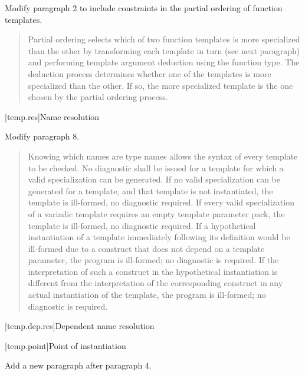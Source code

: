 Modify paragraph 2 to include constraints in the partial ordering
of function templates.

\begin{quote}
\setcounter{Paras}{1}
\pnum
Partial ordering selects which of two function templates is 
more specialized than the other by transforming each template 
in turn (see next paragraph) and performing template argument 
deduction using the function type. The deduction process 
determines whether one of the templates is more specialized 
than the other.
% 
If so, the more specialized template is the one chosen by the 
partial ordering process. 
% 
\end{quote}

[temp.res]{Name resolution}

Modify paragraph 8.

\begin{quote}
\setcounter{Paras}{7}
\pnum
Knowing which names are type names allows the syntax of every
template to be checked. No diagnostic shall be issued for a template
for which a valid specialization can be generated. If no valid
specialization can be generated for a template, and that template is
not instantiated, the template is ill-formed, no diagnostic
required. If every valid specialization of a variadic template
requires an empty template parameter pack, the template is
ill-formed, no diagnostic required. 
If a hypothetical instantiation of a template immediately following
its definition would be ill-formed due to a construct that does not
depend on a template parameter, the program is ill-formed; no
diagnostic is required. If the interpretation of such a construct in
the hypothetical instantiation is different from the interpretation
of the corresponding construct in any actual instantiation of the
template, the program is ill-formed; no diagnostic is required.
\end{quote}

\setcounter{subsection}{3}
[temp.dep.res]{Dependent name resolution}

[temp.point]{Point of instantiation}

Add a new paragraph after paragraph 4.

